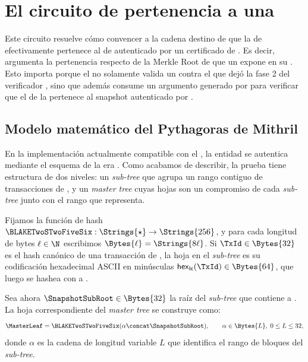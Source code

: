 

\section{El circuito de pertenencia a una \texorpdfstring{\TransactionSnapshot}{TransactionSnapshot}}

Este circuito resuelve cómo convencer a la cadena destino \ChainB de que la \LockTx de \ChainA efectivamente pertenece al \TransactionSnapshot de \Cardano autenticado por un certificado de \Mithril. Es decir, argumenta la pertenencia respecto de la Merkle Root de \CardanoTransactions que un \TransactionSnapshotCertificate expone en su \ProtocolMsg. Esto importa porque el \MintingValidator no solamente valida un \TransactionSnapshotCertificate contra el \ProofReceipt que dejó la fase 2 del verificador \STM, sino que además consume un argumento \Groth generado por \TxSnapshotMembershipCircuit para verificar que el \TxId de la \LockTx pertenece al snapshot autenticado por \TransactionSnapshotCertificate.

\subsection{Modelo matemático del \texorpdfstring{\TransactionSnapshot}{TransactionSnapshot} Pythagoras de Mithril}

En la implementación actualmente compatible con el \MithrilAggregator, la entidad \CardanoTransactions se autentica mediante el esquema \LegacyHashScheme de la era \Pythagoras. Como acabamos de describir, la prueba tiene estructura de dos niveles: un \emph{sub-tree} que agrupa un rango contiguo de transacciones de \Cardano, y un \emph{master tree} cuyas hojas son un compromiso de cada \textit{sub-tree} junto con el rango que representa.

Fijamos la función de hash $\BLAKETwoSTwoFiveSix: \Strings{\star} \to \Strings{256}$, y para cada longitud de bytes $\ell \in \N$ escribimos $\Bytes{\ell} = \Strings{8\ell}$. Si $\TxId \in \Bytes{32}$ es el hash canónico de una transacción de \Cardano, la hoja en el \textit{sub-tree} es su codificación hexadecimal ASCII en minúsculas $\mathsf{hex}_{\mathsf{lc}}(\TxId) \in \Bytes{64}$, que luego se hashea con \BLAKETwoSTwoFiveSix a .

Sea ahora $\SnapshotSubRoot \in \Bytes{32}$ la raíz del \textit{sub-tree} que contiene a \TxId. La hoja correspondiente del \textit{master tree} se construye como:
$$\MasterLeaf = \BLAKETwoSTwoFiveSix(\alpha \concat \SnapshotSubRoot), \qquad \alpha \in \Bytes{L},\; 0 \leq L \leq 32,$$
donde $\alpha$ es la cadena \RangeAscii de longitud variable $L$ que identifica el rango de bloques del \textit{sub-tree}.

